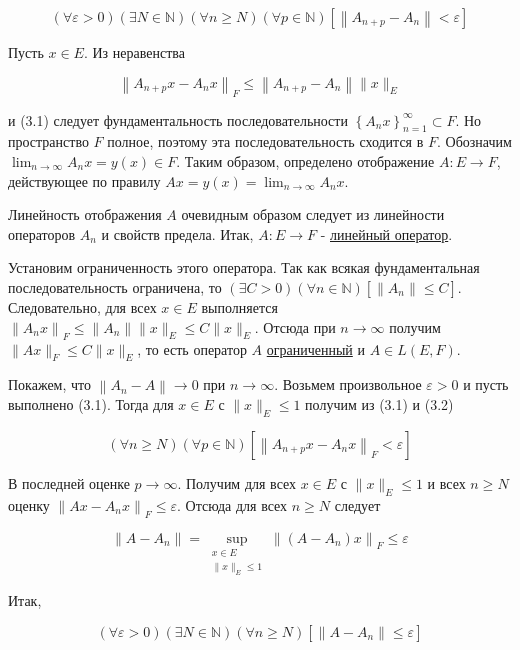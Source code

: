 \documentclass[a4paper, 12pt]{extarticle}
\begin{document}
$$
	(\forall \varepsilon>0)(\exists N \in \mathbb{N})(\forall n \geq N)(\forall p \in \mathbb{N})\left[\left\|A_{n+p}-A_{n}\right\|<\varepsilon\right]
$$

Пусть $x \in E$. Из неравенства

$$
	\left\|A_{n+p} x-A_{n} x\right\|_{F} \leq\left\|A_{n+p}-A_{n}\right\|\|x\|_{E}
$$

и (3.1) следует фундаментальность последовательности $\left\{A_{n} x\right\}_{n=1}^{\infty} \subset F$. Но пространство $F$ полное, поэтому эта последовательность сходится в $F$. Обозначим $\lim _{n \rightarrow \infty} A_{n} x=y(x) \in F$. Таким образом, определено отображение $A: E \rightarrow F$, действующее по правилу $A x=y(x)=\lim _{n \rightarrow \infty} A_{n} x$.

Линейность отображения $A$ очевидным образом следует из линейности операторов $A_{n}$ и свойств предела. Итак, $A: E \rightarrow F$ - \hyperlink{linOperator}{линейный оператор}.

Установим ограниченность этого оператора. Так как всякая фундаментальная последовательность ограничена, то $(\exists C>0)(\forall n \in \mathbb{N})\left[\left\|A_{n}\right\| \leq C\right]$. Следовательно, для всех $x \in E$ выполняется $\left\|A_{n} x\right\|_{F} \leq\left\|A_{n}\right\|\|x\|_{E} \leq C\|x\|_{E}$. Отсюда при $n \rightarrow \infty$ получим $\|A x\|_{F} \leq C\|x\|_{E}$, то есть оператор $A$ \hyperlink{ogranichenn}{ограниченный} и $A \in L(E, F)$.

Покажем, что $\left\|A_{n}-A\right\| \rightarrow 0$ при $n \rightarrow \infty$. Возьмем произвольное $\varepsilon>0$ и пусть выполнено (3.1). Тогда для $x \in E$ с $\|x\|_{E} \leq 1$ получим из (3.1) и (3.2)

$$
	(\forall n \geq N)(\forall p \in \mathbb{N})\left[\left\|A_{n+p} x-A_{n} x\right\|_{F}<\varepsilon\right]
$$

В последней оценке $p \rightarrow \infty$. Получим для всех $x \in E$ с $\|x\|_{E} \leq 1$ и всех $n \geq N$ оценку $\left\|A x-A_{n} x\right\|_{F} \leq \varepsilon$. Отсюда для всех $n \geq N$ следует

$$
	\left\|A-A_{n}\right\|=\sup _{\substack{x \in E \\\|x\|_{E} \leq 1}}\left\|\left(A-A_{n}\right) x\right\|_{F} \leq \varepsilon
$$

Итак,

$$
	(\forall \varepsilon>0)(\exists N \in \mathbb{N})(\forall n \geq N)\left[\left\|A-A_{n}\right\| \leq \varepsilon\right]
$$
\end{document}
